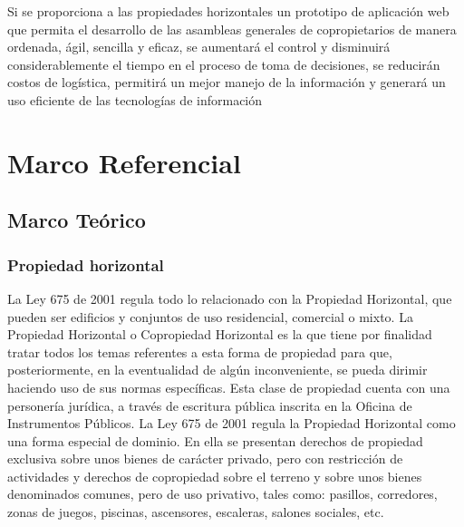 Si se proporciona a las propiedades horizontales un prototipo de aplicación web que permita el desarrollo de las asambleas generales de copropietarios de manera ordenada, ágil, sencilla y eficaz, se aumentará el control y disminuirá considerablemente el tiempo en el proceso de toma de decisiones, se reducirán costos de logística, permitirá un mejor manejo de la información y generará un uso eficiente de las tecnologías de información

\newpage

\section{Marco Referencial}

\subsection{Marco Teórico}

\subsubsection{Propiedad horizontal}	

La Ley 675 de 2001 regula todo lo relacionado con la Propiedad Horizontal, que pueden ser edificios y conjuntos de uso residencial, comercial o mixto. La Propiedad Horizontal o Copropiedad Horizontal es la que tiene por finalidad tratar todos los temas referentes a esta forma de propiedad para que, posteriormente, en la eventualidad de algún inconveniente, se pueda dirimir haciendo uso de sus normas específicas.
Esta clase de propiedad cuenta con una personería jurídica, a través de escritura pública inscrita en la Oficina de Instrumentos Públicos.
La Ley 675 de 2001 regula la Propiedad Horizontal como una forma especial de dominio.  En ella se presentan derechos de propiedad exclusiva sobre unos bienes de carácter privado, pero con restricción de actividades y derechos de copropiedad sobre el terreno y sobre unos bienes denominados comunes, pero de uso privativo, tales como: pasillos, corredores, zonas de juegos, piscinas, ascensores, escaleras, salones sociales, etc.\cite{WEB1}

